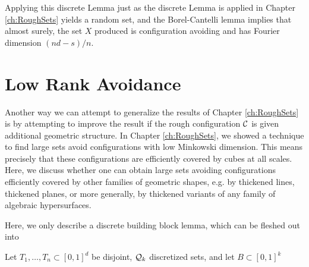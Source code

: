 Applying this discrete Lemma just as the discrete Lemma is applied in Chapter \ref{ch:RoughSets} yields a random set, and the Borel-Cantelli lemma implies that almost surely, the set $X$ produced is configuration avoiding and has Fourier dimension $(nd - s)/n$.

\section{Low Rank Avoidance}

Another way we can attempt to generalize the results of Chapter \ref{ch:RoughSets} is by attempting to improve the result if the rough configuration $\operatorname{\mathcal{C}}$ is given additional geometric structure. In Chapter \ref{ch:RoughSets}, we showed a technique to find large sets avoid configurations with low Minkowski dimension. This means precisely that these configurations are efficiently covered by cubes at all scales. Here, we discuss whether one can obtain large sets avoiding configurations efficiently covered by other families of geometric shapes, e.g. by thickened lines, thickened planes, or more generally, by thickened variants of any family of algebraic hypersurfaces.

Here, we only describe a discrete building block lemma, which can be fleshed out into

\begin{theorem}
    Let $T_1, \dots, T_n \subset [0,1]^d$ be disjoint, $\operatorname{\mathcal{Q}}_k$ discretized sets, and let $B \subset [0,1]^k$
\end{theorem}

\endinput